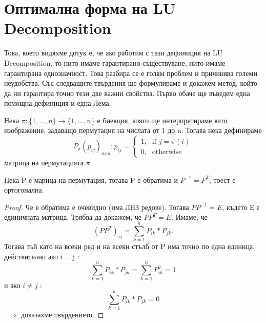 \documentclass{article}
\begin{document}
\section{Оптимална форма на LU Decomposition}
Това, което видяхме дотук е, че ако работим с тази дефиниция на LU Decomposition, то нито имаме гарантирано съществуване, нито имаме гарантирана еднозначност. Това разбира се е голям проблем и причинява големи неудобства. Със следващите твърдения ще формулираме и докажем метод, който да ни гарантира точно тези две важни свойства. Първо обаче ще въведем една помощна дефиниция и една Лема.
\theoremstyle{definition}
\begin{definition}
Нека $\pi : \{1,\dots,n\} \to \{1,\dots,n\}$ е биекция, която ще интерпретираме като изображение, задаващо пермутация на числата от 1 до n. Тогава нека дефинираме  \[ P_{\pi}(p_{ij})_{nxn} : p_{ij} = \begin{cases} \mbox{1,} & \mbox{if } j = \pi(i) \\ \mbox{0,} & \mbox{otherwise} \end{cases} \] матрица на пермутацията $\pi$.
\end{definition}
\begin{lemma}
Нека P е марица на пермутация, тогава P е обратима и $P^{-1} = P^{T}$, тоест е ортогонална.
\end{lemma}
\begin{proof}
Че е обратима е очевидно (има ЛНЗ редове). Тогава $PP^{-1} = E$, където Е е единичната матрица. Трябва да докажем, че $PP^{T} = E$. Имаме, че \[(PP^{T})_{ij} = \sum_{k=1}^{n} P_{ik} * P_{jk}. \] Тогава тъй като на всеки ред и на всеки стълб от P има точно по една единица, действително ако i = j :           \[\sum_{k=1}^{n} P_{ik} * P_{jk} = \sum_{k=1}^{n} P_{ik}^{2} = 1\] и ако $i \ne j$ : \[\sum_{k=1}^{n} P_{ik} * P_{jk} = 0\] $\implies$ доказахме твърдението.
\end{proof}
\end{document}
